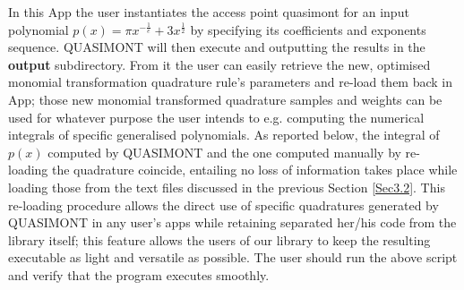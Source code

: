 \documentclass[a4paper, twosided]{book}
\begin{document}
\vspace{0.25cm}
\newpage

\noindent
In this App the user instantiates the access point \colorbox{poliGrayBlue}{quasimont} for an input polynomial $p(x) = \pi x^{-\frac{1}{e}} + 3 x^{\frac{1}{2}}$ by specifying its coefficients and exponents sequence. QUASIMONT will then execute and outputting the results in the \colorbox{poliGrayBlue}{\textbf{output}} subdirectory. From it the user can easily retrieve the new, optimised monomial transformation quadrature rule's parameters and re-load them back in \colorbox{poliGrayBlue}{App}; those new monomial transformed quadrature samples and weights can be used for whatever purpose the user intends to e.g. computing the numerical integrals of specific generalised polynomials. As reported below, the integral of $p(x)$ computed by QUASIMONT and the one computed manually by re-loading the quadrature coincide, entailing no loss of information takes place while loading those from the text files discussed in the previous Section \ref{Sec3.2}. This re-loading procedure allows the direct use of specific quadratures generated by QUASIMONT in any user's apps while retaining separated her/his code from the library itself; this feature allows the users of our library to keep the resulting executable as light and versatile as possible. The user should run the above script and verify that the program executes smoothly.
\end{document}
